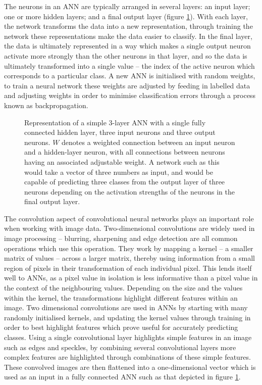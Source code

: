 \documentclass[a4paper,11pt,twoside,openright]{scrbook}
\begin{document}
The neurons in an ANN are typically arranged in several layers: an input layer; one or more hidden layers; and a final output layer (figure \ref{figure:nn_layers}).
With each layer, the network transforms the data into a new representation, through training the network these representations make the data easier to classify.
In the final layer, the data is ultimately represented in a way which makes a single output neuron activate more strongly than the other neurons in that layer, and so the data is ultimately transformed into a single value -- the index of the active neuron which corresponds to a particular class.
A new ANN is initialised with random weights, to train a neural network these weights are adjusted by feeding in labelled data and adjusting weights in order to minimise classification errors through a process known as backpropagation.\cite{Rumelhart1986}




\begin{figure}
\fcapsideleft
{
    \caption[Representation of a simple ANN]{Representation of a simple 3-layer ANN with a single fully connected hidden layer, three input neurons and three output neurons. $W$ denotes a weighted connection between an input neuron and a hidden-layer neuron, with all connections between neurons having an associated adjustable weight. A network such as this would take a vector of three numbers as input, and would be capable of predicting three classes from the output layer of three neurons depending on the activation strengths of the neurons in the final output layer.}
} {
    
    \label{figure:nn_layers}
}
\end{figure}

The convolution aspect of convolutional neural networks plays an important role when working with image data.
Two-dimensional convolutions are widely used in image processing -- blurring, sharpening and edge detection are all common operations which use this operation.
They work by mapping a kernel -- a smaller matrix of values -- across a larger matrix, thereby using information from a small region of pixels in their transformation of each individual pixel.
This lends itself well to ANNs, as a pixel value in isolation is less informative than a pixel value in the context of the neighbouring values.
Depending on the size and the values within the kernel, the transformations highlight different features within an image.
Two dimensional convolutions are used in ANNs by starting with many randomly initialised kernels, and updating the kernel values through training in order to best highlight features which prove useful for accurately predicting classes.
Using a single convolutional layer highlights simple features in an image such as edges and speckles, by combining several convolutional layers more complex features are highlighted through combinations of these simple features.
These convolved images are then flattened into a one-dimensional vector which is used as an input in a fully connected ANN such as that depicted in figure \ref{figure:nn_layers}.
\end{document}
